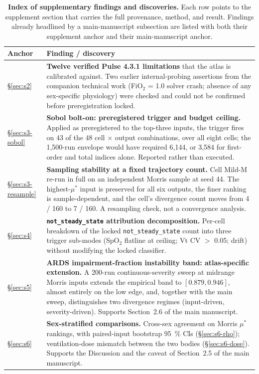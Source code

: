 \documentclass[pdflatex,sn-nature]{sn-jnl}%
\newcommand{\mainref}[2]{#2}
\begin{document}
\begin{table}[htbp]
\centering
\footnotesize
\caption{\textbf{Index of supplementary findings and discoveries.} Each row points to the supplement section that carries the full provenance, method, and result. Findings already headlined by a main-manuscript subsection are listed with both their supplement anchor and their main-manuscript anchor.}
\label{tab:s16-index}
\begin{tabular}{lp{}}
\toprule
Anchor & Finding / discovery \\
\midrule
\S\ref{sec:s2} & \textbf{Twelve verified Pulse 4.3.1 limitations} that the atlas is calibrated against. Two earlier internal-probing assertions from the companion technical work (FiO$_2$ = 1.0 solver crash; absence of any sex-specific physiology) were checked and could not be confirmed before preregistration locked. \\
\S\ref{sec:s3-sobol} & \textbf{Sobol bolt-on: preregistered trigger and budget ceiling.} Applied as preregistered to the top-three inputs, the trigger fires on 43 of the 48 cell $\times$ output combinations, over all eight cells; the 1{,}500-run envelope would have required 6{,}144, or 3{,}584 for first-order and total indices alone. Reported rather than executed. \\
\S\ref{sec:s3-resample} & \textbf{Sampling stability at a fixed trajectory count.} Cell Mild-M re-run in full on an independent Morris sample at seed 44. The highest-$\mu^{*}$ input is preserved for all six outputs, the finer ranking is sample-dependent, and the cell's divergence count moves from 4 / 160 to 7 / 160. A resampling check, not a convergence analysis. \\
\S\ref{sec:s4} & \textbf{\texttt{not\_steady\_state} attribution decomposition.} Per-cell breakdown of the locked \texttt{not\_steady\_state} count into three trigger sub-modes (SpO$_2$ flatline at ceiling; Vt CV $>$ 0.05; drift) without modifying the locked classifier. \\
\S\ref{sec:s5} & \textbf{ARDS impairment-fraction instability band: atlas-specific extension.} A 200-run continuous-severity sweep at midrange Morris inputs extends the empirical band to $[0.879, 0.946]$, almost entirely on the low edge, and, together with the main sweep, distinguishes two divergence regimes (input-driven, severity-driven). Supports Section~\mainref{sec:results-secondary}{2.6} of the main manuscript. \\
\S\ref{sec:s6} & \textbf{Sex-stratified comparisons.} Cross-sex agreement on Morris $\mu^{*}$ rankings, with paired-input bootstrap 95~\% CIs (\S\ref{sec:s6-rho}); ventilation-dose mismatch between the two bodies (\S\ref{sec:s6-dose}). Supports the Discussion and the caveat of Section~\mainref{sec:results-sex}{2.5} of the main manuscript. \\

\end{tabular}
\end{table}
\end{document}
